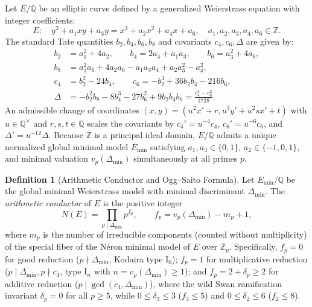 \documentclass[10pt,a4paper]{article}
\theoremstyle{plain}
\theoremstyle{definition}
\newtheorem{definition}[theorem]{Definition}
\theoremstyle{remark}
\begin{document}
Let $E/\mathbb{Q}$ be an elliptic curve defined by a generalized Weierstrass equation with integer coefficients:
\begin{equation}\label{eq:weierstrass}
E: \quad y^2 + a_1 x y + a_3 y = x^3 + a_2 x^2 + a_4 x + a_6, \quad a_1, a_2, a_3, a_4, a_6 \in \mathbb{Z}.
\end{equation}
The standard Tate quantities $b_2, b_4, b_6, b_8$ and covariants $c_4, c_6, \Delta$ are given by:
\begin{align}
b_2 &= a_1^2 + 4a_2, \qquad b_4 = 2a_4 + a_1 a_3, \qquad b_6 = a_3^2 + 4a_6, \\
b_8 &= a_1^2 a_6 + 4a_2 a_6 - a_1 a_3 a_4 + a_2 a_3^2 - a_4^2, \\
c_4 &= b_2^2 - 24b_4, \qquad c_6 = -b_2^3 + 36b_2 b_4 - 216b_6, \\
\Delta &= -b_2^2 b_8 - 8b_4^3 - 27b_6^2 + 9b_2 b_4 b_6 = \frac{c_4^3 - c_6^2}{1728}.
\end{align}
An admissible change of coordinates $(x, y) = (u^2 x' + r, u^3 y' + u^2 s x' + t)$ with $u \in \mathbb{Q}^\times$ and $r, s, t \in \mathbb{Q}$ scales the covariants by $c_4' = u^{-4} c_4$, $c_6' = u^{-6} c_6$, and $\Delta' = u^{-12} \Delta$. Because $\mathbb{Z}$ is a principal ideal domain, $E/\mathbb{Q}$ admits a unique normalized global minimal model $E_{\min}$ satisfying $a_1, a_3 \in \{0, 1\}$, $a_2 \in \{-1, 0, 1\}$, and minimal valuation $v_p(\Delta_{\min})$ simultaneously at all primes $p$.

\begin{definition}[Arithmetic Conductor and Ogg--Saito Formula]
Let $E_{\min}/\mathbb{Q}$ be the global minimal Weierstrass model with minimal discriminant $\Delta_{\min}$. The \emph{arithmetic conductor} of $E$ is the positive integer
\begin{equation}
N(E) = \prod_{p \mid \Delta_{\min}} p^{f_p}, \qquad f_p = v_p(\Delta_{\min}) - m_p + 1,
\end{equation}
where $m_p$ is the number of irreducible components (counted without multiplicity) of the special fiber of the N\'{e}ron minimal model of $E$ over $\mathbb{Z}_p$. Specifically, $f_p = 0$ for good reduction ($p \nmid \Delta_{\min}$, Kodaira type $\mathrm{I}_0$); $f_p = 1$ for multiplicative reduction ($p \mid \Delta_{\min}, p \nmid c_4$, type $\mathrm{I}_n$ with $n = v_p(\Delta_{\min}) \ge 1$); and $f_p = 2 + \delta_p \ge 2$ for additive reduction ($p \mid \gcd(c_4, \Delta_{\min})$), where the wild Swan ramification invariant $\delta_p = 0$ for all $p \ge 5$, while $0 \le \delta_3 \le 3$ ($f_3 \le 5$) and $0 \le \delta_2 \le 6$ ($f_2 \le 8$).
\end{definition}
\end{document}
